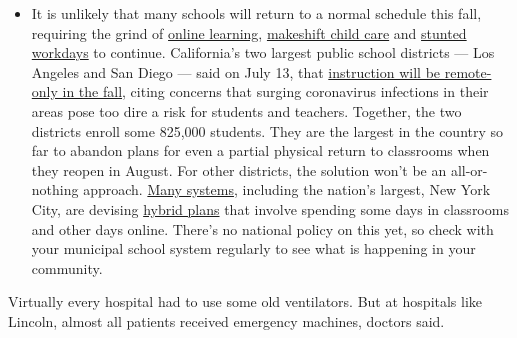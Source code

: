 \begin{itemize}
  \begin{itemize}
  \tightlist
  \item
    It is unlikely that many schools will return to a normal schedule
    this fall, requiring the grind of
    \href{https://www.nytimes3xbfgragh.onion/2020/06/05/us/coronavirus-education-lost-learning.html?action=click\&pgtype=Article\&state=default\&region=MAIN_CONTENT_3\&context=storylines_faq}{online
    learning},
    \href{https://www.nytimes3xbfgragh.onion/2020/05/29/us/coronavirus-child-care-centers.html?action=click\&pgtype=Article\&state=default\&region=MAIN_CONTENT_3\&context=storylines_faq}{makeshift
    child care} and
    \href{https://www.nytimes3xbfgragh.onion/2020/06/03/business/economy/coronavirus-working-women.html?action=click\&pgtype=Article\&state=default\&region=MAIN_CONTENT_3\&context=storylines_faq}{stunted
    workdays} to continue. California's two largest public school
    districts --- Los Angeles and San Diego --- said on July 13, that
    \href{https://www.nytimes3xbfgragh.onion/2020/07/13/us/lausd-san-diego-school-reopening.html?action=click\&pgtype=Article\&state=default\&region=MAIN_CONTENT_3\&context=storylines_faq}{instruction
    will be remote-only in the fall}, citing concerns that surging
    coronavirus infections in their areas pose too dire a risk for
    students and teachers. Together, the two districts enroll some
    825,000 students. They are the largest in the country so far to
    abandon plans for even a partial physical return to classrooms when
    they reopen in August. For other districts, the solution won't be an
    all-or-nothing approach.
    \href{https://bioethics.jhu.edu/research-and-outreach/projects/eschool-initiative/school-policy-tracker/}{Many
    systems}, including the nation's largest, New York City, are
    devising
    \href{https://www.nytimes3xbfgragh.onion/2020/06/26/us/coronavirus-schools-reopen-fall.html?action=click\&pgtype=Article\&state=default\&region=MAIN_CONTENT_3\&context=storylines_faq}{hybrid
    plans} that involve spending some days in classrooms and other days
    online. There's no national policy on this yet, so check with your
    municipal school system regularly to see what is happening in your
    community.
  \end{itemize}
\end{itemize}

Virtually every hospital had to use some old ventilators. But at
hospitals like Lincoln, almost all patients received emergency machines,
doctors said.

